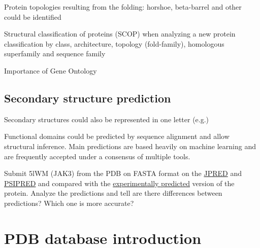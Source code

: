 \documentclass[
  letterpaper,
  DIV=11,
  numbers=noendperiod,
  oneside]{scrreprt}
\begin{document}
Protein topologies resulting from the folding: horshoe, beta-barrel and
other could be identified

Structural classification of proteins (SCOP) when analyzing a new
protein classification by class, architecture, topology (fold-family),
homologous superfamily and sequence family

Importance of Gene Ontology

\hypertarget{secondary-structure-prediction}{%
\subsection{Secondary structure
prediction}\label{secondary-structure-prediction}}

Secondary structures could also be represented in one letter (e.g.)

Functional domains could be predicted by sequence alignment and allow
structural inference. Main predictions are based heavily on machine
learning and are frequently accepted under a consensus of multiple
tools.

{}

\begin{tcolorbox}[enhanced jigsaw, opacityback=0, leftrule=.75mm, breakable, titlerule=0mm, toprule=.15mm, rightrule=.15mm, title=\textcolor{quarto-callout-warning-color}{\faExclamationTriangle}\hspace{0.5em}{Exercise 01}, colback=white, opacitybacktitle=0.6, toptitle=1mm, bottomtitle=1mm, colframe=quarto-callout-warning-color-frame, colbacktitle=quarto-callout-warning-color!10!white, arc=.35mm, coltitle=black, bottomrule=.15mm, left=2mm]
Submit 5lWM (JAK3) from the PDB on FASTA format on the
\href{http://www.compbio.dundee.ac.uk/jpred/}{JPRED} and
\href{http://bioinf.cs.ucl.ac.uk/psipred/}{PSIPRED} and compared with
the \href{https://www.rcsb.org/sequence/5LWM}{experimentally predicted}
version of the protein. Analyze the predictions and tell are there
differences between predictions? Which one is more accurate?
\end{tcolorbox}

\hypertarget{pdb-database-introduction}{%
\section{PDB database introduction}\label{pdb-database-introduction}}
\end{document}

